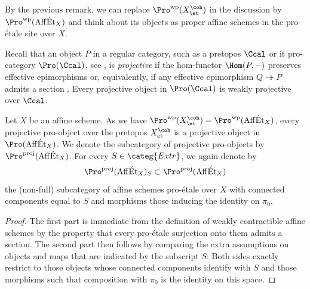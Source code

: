 \documentclass[leqno]{article}
\newcommand{\Extr}{\categ{Extr}}
\newcommand{\Et}[1]{\mathrm{\acute{E}t}_{#1}}
\begin{document}
%
By the previous remark, we can replace $\Pro^{\mathrm{wp}}(X_{\et}^{\coh})$ in the discussion by $\Pro^{\mathrm{wp}}(\mathrm{Aff}\Et{X})$ and think about its objects as proper affine schemes in the pro-\'etale site over $X$. 
%
\begin{recollection}
    Recall that an object $P$ in a regular category, such as a pretopos $\Ccal$ or it pro-category $\Pro(\Ccal)$, see \cite[Corollary 6.1.20]{Ultracategories}, is \textit{projective} if the hom-functor $\Hom(P,-)$ preserves effective epimorphisms or, equivalently, if any effective epimorphism $Q\twoheadrightarrow P$ admits a section \cite[Proposition 6.2.1]{Ultracategories}. Every projective object in $\Pro(\Ccal)$ is weakly projective over $\Ccal$.
\end{recollection}
%
\begin{notation}
    Let $X$ be an affine scheme. As we have $\Pro^{\mathrm{wp}}(X_{\et}^{\coh})=\Pro^{\mathrm{wp}}(\mathrm{Aff}\Et{X})$, every projective pro-object over the pretopos $X_{\mathrm{et}}^{\coh}$ is a projective object in $\Pro(\mathrm{Aff}\Et{X})$. We denote the subcategory of projective pro-objects by $\Pro^{\mathrm{proj}}(\mathrm{Aff}\Et{X})$.
    For every $S\in \Extr$, we again denote by $$\Pro^{\mathrm{proj}}(\mathrm{Aff}\Et{X})_S\subset \Pro^{\mathrm{proj}}(\mathrm{Aff}\Et{X})$$ the (non-full) subcategory of affine schemes pro-\'etale over $X$ with connected components equal to $S$ and morphisms those inducing the identity on $\pi_0$.
\end{notation}
%
%
\begin{proof}
    The first part is immediate from the definition of weakly contractible affine schemes by the property that every pro-\'etale surjection onto them admits a section. 
    The second part then follows by comparing the extra assumptions on objects and maps that are indicated by the subscript $S$: Both sides exactly restrict to those objects whose connected components identify with $S$ and those morphisms such that composition with $\pi_0$ is the identity on this space.
\end{proof}
\end{document}
